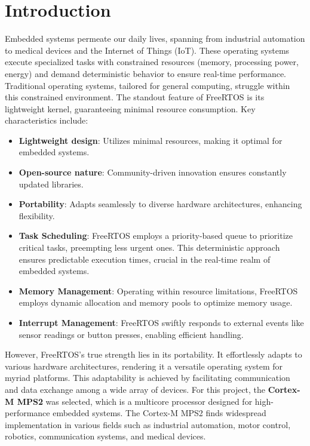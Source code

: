 \documentclass[9pt, reqno]{amsart}
\theoremstyle{definition}
\theoremstyle{remark}
\numberwithin{equation}{section}
\begin{document}
{\section{Introduction}

\noindent Embedded systems permeate our daily lives, spanning from industrial automation to medical devices and the Internet of Things (IoT). These operating systems execute specialized tasks with constrained resources (memory, processing power, energy) and demand deterministic behavior to ensure real-time performance. Traditional operating systems, tailored for general computing, struggle within this constrained environment.
The standout feature of FreeRTOS is its lightweight kernel, guaranteeing minimal resource consumption. Key characteristics include:


\begin{itemize}
        \item \textbf{Lightweight design}: Utilizes minimal resources, making it optimal for embedded systems.
	\item \textbf{Open-source nature}: Community-driven innovation ensures constantly updated libraries.
	\item \textbf{Portability}: Adapts seamlessly to diverse hardware architectures, enhancing flexibility.
	\item \textbf{Task Scheduling}: FreeRTOS employs a priority-based queue to prioritize critical tasks, preempting less urgent ones. This deterministic approach ensures predictable execution times, crucial in the real-time realm of embedded systems.
	\item \textbf{Memory Management}: Operating within resource limitations, FreeRTOS employs dynamic allocation and memory pools to optimize memory usage.
	\item \textbf{Interrupt Management}: FreeRTOS swiftly responds to external events like sensor readings or button presses, enabling efficient handling.
\end{itemize}
However, FreeRTOS's true strength lies in its portability. It effortlessly adapts to various hardware architectures, rendering it a versatile operating system for myriad platforms. This adaptability is achieved by facilitating communication and data exchange among a wide array of devices\cite{download1}.
For this project, the \textbf{Cortex-M MPS2} was selected, which is a multicore processor designed for high-performance embedded systems. The Cortex-M MPS2 finds widespread implementation in various fields such as industrial automation, motor control, robotics, communication systems, and medical devices.
}
\end{document}

